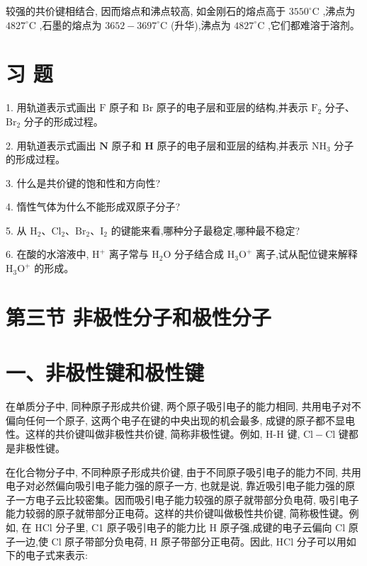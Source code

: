 \documentclass[10pt]{article}
\newcommand{\customfootnote}[1]{
  \let\thefootnote\relax\footnotetext{#1}
}
\begin{document}
较强的共价键相结合, 因而熔点和沸点较高, 如金刚石的熔点高于 \({3550}^{ \circ }\mathrm{C}\) ,沸点为 \({4827}^{ \circ }\mathrm{C}\) ,石墨的熔点为 \({3652} - {3697}^{ \circ }\mathrm{C}\) (升华),沸点为 \({4827}^{ \circ }\mathrm{C}\) ,它们都难溶于溶剂。

\customfootnote{

① 严格地说, 石墨是一种过渡型晶体。

}

\section*{习 题}

1. 用轨道表示式画出 \(\mathrm{F}\) 原子和 \(\mathrm{{Br}}\) 原子的电子层和亚层的结构,并表示 \({\mathrm{F}}_{2}\) 分子、 \({\mathrm{{Br}}}_{2}\) 分子的形成过程。

2. 用轨道表示式画出 \(\mathbf{N}\) 原子和 \(\mathbf{H}\) 原子的电子层和亚层的结构,并表示 \({\mathrm{{NH}}}_{3}\) 分子的形成过程。

3. 什么是共价键的饱和性和方向性?

4. 惰性气体为什么不能形成双原子分子?

5. 从 \({\mathrm{H}}_{2}\text{、}{\mathrm{{Cl}}}_{2}\text{、}{\mathrm{{Br}}}_{2}\text{、}{\mathrm{I}}_{2}\) 的键能来看,哪种分子最稳定,哪种最不稳定?

6. 在酸的水溶液中, \({\mathrm{H}}^{ + }\) 离子常与 \({\mathrm{H}}_{2}\mathrm{O}\) 分子结合成 \({\mathrm{H}}_{3}{\mathrm{O}}^{ + }\) 离子,试从配位键来解释 \({\mathrm{H}}_{3}{\mathrm{O}}^{ + }\) 的形成。

\section*{第三节 非极性分子和极性分子}

\section*{一、非极性键和极性键}

在单质分子中, 同种原子形成共价键, 两个原子吸引电子的能力相同, 共用电子对不偏向任何一个原子, 这两个电子在键的中央出现的机会最多, 成键的原子都不显电性。这样的共价键叫做非极性共价键, 简称非极性键。例如, H-H 键, \(\mathrm{{Cl}} - \mathrm{{Cl}}\) 键都是非极性键。

在化合物分子中, 不同种原子形成共价键, 由于不同原子吸引电子的能力不同, 共用电子对必然偏向吸引电子能力强的原子一方, 也就是说, 靠近吸引电子能力强的原子一方电子云比较密集。因而吸引电子能力较强的原子就带部分负电荷, 吸引电子能力较弱的原子就带部分正电荷。这样的共价键叫做极性共价键, 简称极性键。例如, 在 HCl 分子里, C1 原子吸引电子的能力比 \(\mathrm{H}\) 原子强,成键的电子云偏向 \(\mathrm{{Cl}}\) 原子一边,使 \(\mathrm{{Cl}}\) 原子带部分负电荷, \(\mathrm{H}\) 原子带部分正电荷。因此, \(\mathrm{{HCl}}\) 分子可以用如下的电子式来表示:
\end{document}
